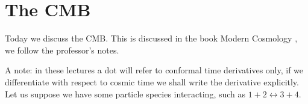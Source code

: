 \documentclass[main.tex]{subfiles}
\begin{document}
\chapter{The CMB}


Today we discuss the CMB. 
This is discussed in the book Modern Cosmology \cite{dodelsonModernCosmology2003}, we follow the professor's notes.

A note: in these lectures a dot will refer to conformal time derivatives only, if we differentiate with respect to cosmic time we shall write the derivative explicitly.
Let us suppose we have some particle species interacting, such as \(1 + 2 \leftrightarrow 3 +4\). 
\end{document}

